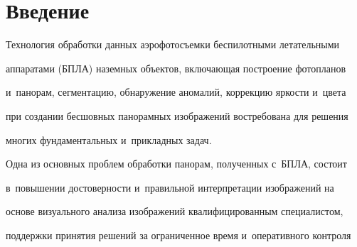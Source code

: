   




  












 \thispagestyle{headings}


 


 \vspace*{-16pt}


 


  \section{Введение}


  


  \vspace*{-4pt}


  


  Технология обработки данных аэро\-фо\-то\-съем\-ки беспилотными летательными 


аппаратами (БПЛА) наземных объектов, вклю\-ча\-ющая по\-стро\-ение фотопланов 


и~панорам, сег\-мен\-та\-цию, обнаружение аномалий, коррекцию яр\-кости и~цвета 


при создании бес\-шов\-ных па\-но\-рам\-ных изображений вос\-тре\-бо\-ва\-на для решения 


многих фундаментальных и~при\-клад\-ных задач. 


  


  Одна из основных проб\-лем обработки па\-но\-рам, полученных с~БПЛА, со\-сто\-ит 


в~повышении достоверности и~правильной интерпретации изображений на 


основе визуального анализа изображений квалифицированным специалистом, 


поддержки принятия решений за ограниченное время и~оперативного контроля 


